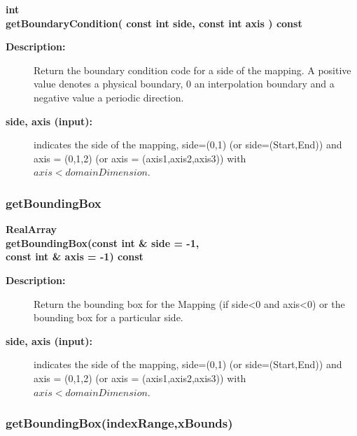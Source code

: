 \begin{flushleft} \textbf{%
int  \\ 
\settowidth{\MappingIncludeArgIndent}{getBoundaryCondition(}%
getBoundaryCondition( const int side, const int axis ) const 
}\end{flushleft}
\begin{description}
\item[{\bf Description:}] 
   Return the boundary condition code for a side of the mapping.
   A positive value denotes a physical boundary, 0 an interpolation boundary
   and a negative value a periodic direction.
\item[{\bf side, axis (input):}]  indicates the side of the mapping, side=(0,1) (or side=(Start,End)) 
     and axis = (0,1,2) (or axis = (axis1,axis2,axis3)) with $axis<domainDimension$.
\end{description}
\subsubsection{getBoundingBox}
 
\begin{flushleft} \textbf{%
RealArray  \\ 
\settowidth{\MappingIncludeArgIndent}{getBoundingBox(}%
getBoundingBox(const int \& side  = -1, \\ 
\hspace{\MappingIncludeArgIndent}const int \& axis  = -1) const 
}\end{flushleft}
\begin{description}
\item[{\bf Description:}] 
   Return the bounding box for the Mapping (if side<0 and axis<0) or the bounding
   box for a particular side.
\item[{\bf side, axis (input):}]  indicates the side of the mapping, side=(0,1) (or side=(Start,End)) 
     and axis = (0,1,2) (or axis = (axis1,axis2,axis3)) with $axis<domainDimension$.
\end{description}
\subsubsection{getBoundingBox(indexRange,xBounds)}
 

